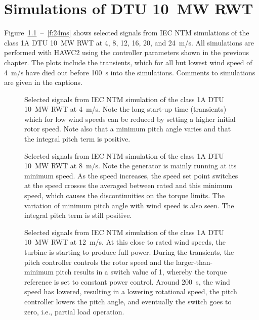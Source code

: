 \chapter{Simulations of DTU 10~MW RWT}

Figure~\ref{f:4ms}~--~\ref{f:24ms} shows selected signals from IEC NTM simulations of the class 1A DTU 10~MW RWT at 4, 8, 12, 16, 20, and 24~m/s. All simulations are performed with HAWC2 using the controller parameters shown in the previous chapter. The plots include the transients, which for all but lowest wind speed of 4~m/s have died out before 100~s into the simulations. Comments to simulations are given in the captions.


\begin{figure}[t]
\centerline{ }
\caption{Selected signals from IEC NTM simulation of the class 1A DTU 10~MW RWT at 4~m/s. Note the long start-up time (transients) which for low wind speeds can be reduced by setting a higher initial rotor speed. Note also that a minimum pitch angle varies and that the integral pitch term is positive. \label{f:4ms}}
\end{figure}


\begin{figure}[t]
\centerline{ }
\caption{Selected signals from IEC NTM simulation of the class 1A DTU 10~MW RWT at 8~m/s. Note the generator is mainly running at its minimum speed. As the speed increases, the speed set point switches at the speed crosses the averaged between rated and this minimum speed, which causes the discontinuities on the torque limits. The variation of minimum pitch angle with wind speed is also seen. The integral pitch term is still positive. \label{f:8ms}}
\end{figure}


\begin{figure}[t]
\centerline{ }
\caption{Selected signals from IEC NTM simulation of the class 1A DTU 10~MW RWT at 12~m/s. At this close to rated wind speeds, the turbine is starting to produce full power. During the transients, the pitch controller controls the rotor speed and the larger-than-minimum pitch results in a switch value of 1, whereby the torque reference is set to constant power control. Around 200~s, the wind speed has lowered, resulting in a lowering rotational speed, the pitch controller lowers the pitch angle, and eventually the switch goes to zero, i.e., partial load operation. \label{f:12ms}}
\end{figure}



